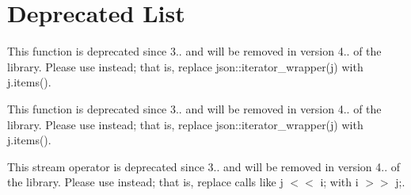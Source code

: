 \chapter{Deprecated List}
\hypertarget{deprecated}{}\label{deprecated}

\begin{DoxyRefList}
\item[Global \doxylink{classbasic__json_a091a63384590fe2cf7a122155b30011a}{basic\+\_\+json\texorpdfstring{$<$}{<} Object\+Type, Array\+Type, String\+Type, Boolean\+Type, Number\+Integer\+Type, Number\+Unsigned\+Type, Number\+Float\+Type, Allocator\+Type, JSONSerializer, Binary\+Type \texorpdfstring{$>$}{>}\+::iterator\+\_\+wrapper} (reference ref) noexcept]\label{deprecated__deprecated000004}%
%
This function is deprecated since 3.. and will be removed in version 4.. of the library. Please use  instead; that is, replace {\ttfamily json\+::iterator\+\_\+wrapper(j)} with {\ttfamily j.\+items()}.  
\item[Global \doxylink{classbasic__json_af373ec8f75f254b79fe1b1ca776797b9}{basic\+\_\+json\texorpdfstring{$<$}{<} Object\+Type, Array\+Type, String\+Type, Boolean\+Type, Number\+Integer\+Type, Number\+Unsigned\+Type, Number\+Float\+Type, Allocator\+Type, JSONSerializer, Binary\+Type \texorpdfstring{$>$}{>}\+::iterator\+\_\+wrapper} (const\+\_\+reference ref) noexcept]\label{deprecated__deprecated000005}%
%
This function is deprecated since 3.. and will be removed in version 4.. of the library. Please use  instead; that is, replace {\ttfamily json\+::iterator\+\_\+wrapper(j)} with {\ttfamily j.\+items()}.  
\item[Global \doxylink{classbasic__json_af9907af448f7ff794120033e132025f6}{basic\+\_\+json\texorpdfstring{$<$}{<} Object\+Type, Array\+Type, String\+Type, Boolean\+Type, Number\+Integer\+Type, Number\+Unsigned\+Type, Number\+Float\+Type, Allocator\+Type, JSONSerializer, Binary\+Type \texorpdfstring{$>$}{>}\+::operator\texorpdfstring{$<$}{<}\texorpdfstring{$<$}{<}} (\doxylink{classbasic__json}{basic\+\_\+json} \&j, std\+::istream \&i)]\label{deprecated__deprecated000007}%
%
This stream operator is deprecated since 3.. and will be removed in version 4.. of the library. Please use  instead; that is, replace calls like {\ttfamily j \texorpdfstring{$<$}{<}\texorpdfstring{$<$}{<} i;} with {\ttfamily i \texorpdfstring{$>$}{>}\texorpdfstring{$>$}{>} j;}.  

\end{DoxyRefList}
